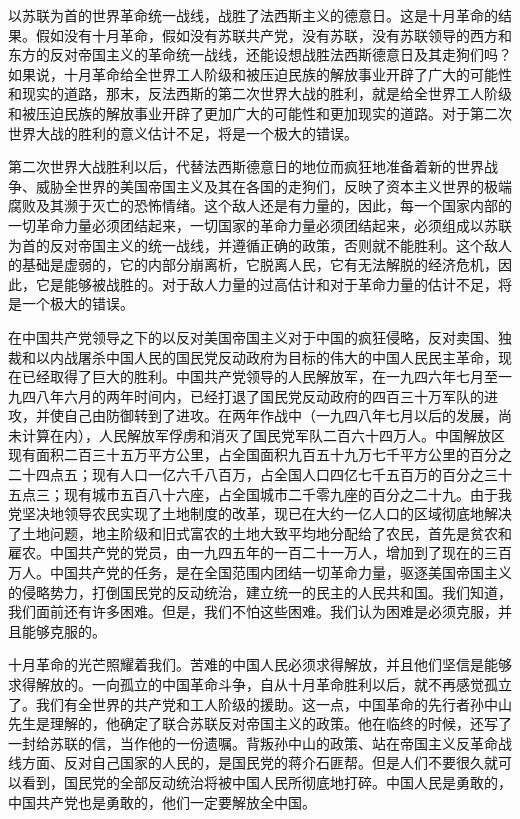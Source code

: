 \documentclass[UTF-8, a5paper, 12pt]{ctexart}
\begin{document}
以苏联为首的世界革命统一战线，战胜了法西斯主义的德意日。这是十月革命的结果。假如没有十月革命，假如没有苏联共产党，没有苏联，没有苏联领导的西方和东方的反对帝国主义的革命统一战线，还能设想战胜法西斯德意日及其走狗们吗？如果说，十月革命给全世界工人阶级和被压迫民族的解放事业开辟了广大的可能性和现实的道路，那末，反法西斯的第二次世界大战的胜利，就是给全世界工人阶级和被压迫民族的解放事业开辟了更加广大的可能性和更加现实的道路。对于第二次世界大战的胜利的意义估计不足，将是一个极大的错误。

第二次世界大战胜利以后，代替法西斯德意日的地位而疯狂地准备着新的世界战争、威胁全世界的美国帝国主义及其在各国的走狗们，反映了资本主义世界的极端腐败及其濒于灭亡的恐怖情绪。这个敌人还是有力量的，因此，每一个国家内部的一切革命力量必须团结起来，一切国家的革命力量必须团结起来，必须组成以苏联为首的反对帝国主义的统一战线，并遵循正确的政策，否则就不能胜利。这个敌人的基础是虚弱的，它的内部分崩离析，它脱离人民，它有无法解脱的经济危机，因此，它是能够被战胜的。对于敌人力量的过高估计和对于革命力量的估计不足，将是一个极大的错误。

在中国共产党领导之下的以反对美国帝国主义对于中国的疯狂侵略，反对卖国、独裁和以内战屠杀中国人民的国民党反动政府为目标的伟大的中国人民民主革命，现在已经取得了巨大的胜利。中国共产党领导的人民解放军，在一九四六年七月至一九四八年六月的两年时间内，已经打退了国民党反动政府的四百三十万军队的进攻，并使自己由防御转到了进攻。在两年作战中（一九四八年七月以后的发展，尚未计算在内），人民解放军俘虏和消灭了国民党军队二百六十四万人。中国解放区现有面积二百三十五万平方公里，占全国面积九百五十九万七千平方公里的百分之二十四点五；现有人口一亿六千八百万，占全国人口四亿七千五百万的百分之三十五点三；现有城市五百八十六座，占全国城市二千零九座的百分之二十九。由于我党坚决地领导农民实现了土地制度的改革，现已在大约一亿人口的区域彻底地解决了土地问题，地主阶级和旧式富农的土地大致平均地分配给了农民，首先是贫农和雇农。中国共产党的党员，由一九四五年的一百二十一万人，增加到了现在的三百万人。中国共产党的任务，是在全国范围内团结一切革命力量，驱逐美国帝国主义的侵略势力，打倒国民党的反动统治，建立统一的民主的人民共和国。我们知道，我们面前还有许多困难。但是，我们不怕这些困难。我们认为困难是必须克服，并且能够克服的。

十月革命的光芒照耀着我们。苦难的中国人民必须求得解放，并且他们坚信是能够求得解放的。一向孤立的中国革命斗争，自从十月革命胜利以后，就不再感觉孤立了。我们有全世界的共产党和工人阶级的援助。这一点，中国革命的先行者孙中山先生是理解的，他确定了联合苏联反对帝国主义的政策。他在临终的时候，还写了一封给苏联的信，当作他的一份遗嘱。背叛孙中山的政策、站在帝国主义反革命战线方面、反对自己国家的人民的，是国民党的蒋介石匪帮。但是人们不要很久就可以看到，国民党的全部反动统治将被中国人民所彻底地打碎。中国人民是勇敢的，中国共产党也是勇敢的，他们一定要解放全中国。
\end{document}
